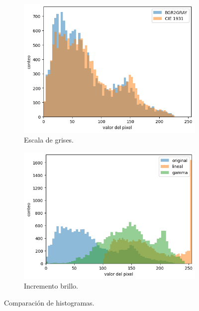 \documentclass{article}
\begin{document}
\begin{figure}
	\centering
	\begin{subfigure}[b]{0.48\textwidth}
		\includegraphics[width= \textwidth]{grayHist}
		\caption{Escala de grises.}
		\label{fg:grayHist}
	\end{subfigure}
	\begin{subfigure}[b]{0.48\textwidth}
		\includegraphics[width= \textwidth]{brightHist}
		\caption{Incremento brillo.}
		\label{fg:brightHist}
	\end{subfigure}
	\caption{Comparación de histogramas.}
\end{figure}


\end{document}
